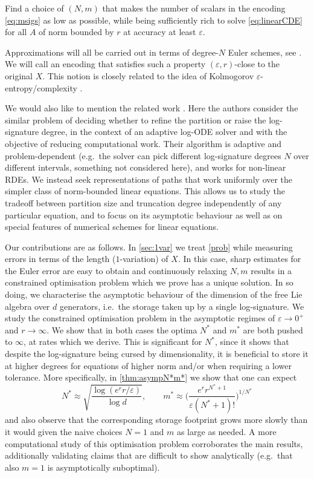 \documentclass{article}
\def\eps{\varepsilon}
\numberwithin{equation}{section}
\theoremstyle{definition}
\theoremstyle{remark}
\begin{document}
\begin{problem}[informal]\label{prob}
Find a choice of $(N, m)$ that makes the number of scalars in the encoding \eqref{eq:msigs} as low as possible, while being sufficiently rich to solve \eqref{eq:linearCDE} for all $A$ of norm bounded by $r$ at accuracy at least $\varepsilon$.
\end{problem}

Approximations will all be carried out in terms of degree-$N$ Euler schemes, see \cite[Ch.\ 10]{FV10}. We will call an encoding that satisfies such a property $(\varepsilon, r)$-close to the original $X$. This notion is closely related to the idea of Kolmogorov $\varepsilon$-entropy/complexity \cite{Kol56, KT59, Kol83, DP13}.

We would also like to mention the related work \cite{BBL23}. Here the authors consider the similar problem of deciding whether to refine the partition or raise the log-signature degree, in the context of an adaptive log-ODE solver and with the objective of reducing computational work. Their algorithm is adaptive and problem-dependent (e.g.\ the solver can pick different log-signature degrees $N$ over different intervals, something not considered here), and works for non-linear RDEs. We instead seek representations of paths that work uniformly over the simpler class of norm-bounded linear equations. This allows us to study the tradeoff between partition size and truncation degree independently of any particular equation, and to focus on its asymptotic behaviour as well as on special features of numerical schemes for linear equations.

Our contributions are as follows. In \autoref{sec:1var} we treat \autoref{prob} while measuring errors in terms of the length ($1$-variation) of $X$. In this case, sharp estimates for the Euler error are easy to obtain and continuously relaxing $N, m$ results in a constrained optimisation problem which we prove has a unique solution. In so doing, we characterise the asymptotic behaviour of the dimension of the free Lie algebra over $d$ generators, i.e.\ the storage taken up by a single log-signature. We study the constrained optimisation problem in the asymptotic regimes of $\varepsilon \to 0^+$ and $r \to \infty$. We show that in both cases the optima $N^*$ and $m^*$ are both pushed to $\infty$, at rates which we derive. This is significant for $N^*$, since it shows that despite the log-signature being cursed by dimensionality, it is beneficial to store it at higher degrees for equations of higher norm and/or when requiring a lower tolerance. More specifically, in \autoref{thm:asympN*m*} we show that one can expect
\[
N^* \approx \sqrt{\frac{\log(e^rr/\eps)}{\log d}}, \qquad m^* \approx \bigg(\frac{e^r r^{N^*+1}}{\eps (N^*+1)!} \bigg)^{1/N^*}
\]
and also observe that the corresponding storage footprint grows more slowly than it would given the naive choices $N = 1$ and $m$ as large as needed. A more computational study of this optimisation problem corroborates the main results, additionally validating claims that are difficult to show analytically (e.g.\ that also $m = 1$ is asymptotically suboptimal).
\end{document}
